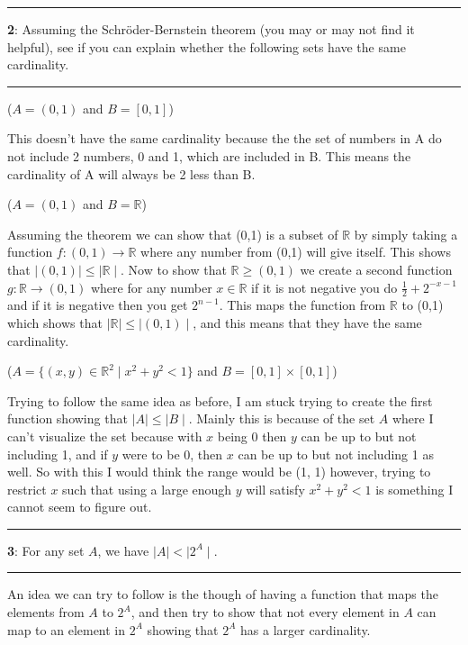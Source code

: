 \documentclass[11pt]{article}
\newcommand\question[2]{\vspace{.25in}\hrule\textbf{#1}: #2\vspace{.5em}\hrule\vspace{.10in}}
\renewcommand\part[1]{\vspace{.10in}(#1)\par}
\newcommand{\R}{\mathbb{R}}
\begin{document}
\question{2}{Assuming the Schröder-Bernstein theorem (you may or may not find it helpful), see if you can explain whether the following sets have the same cardinality.}

\part{$A = ( 0 , 1 )$ and $B=[0,1]$}

This doesn't have the same cardinality because the the set of numbers in A do not include 2 numbers, 0 and 1, which are included in B. This means the cardinality of A will always be 2 less than B.

\part{$A = ( 0 , 1 )$ and $ B=\mathbb{R}$}
Assuming the theorem we can show that (0,1) is a subset of $\R$ by simply taking a function $f: (0,1) \rightarrow \R$ where any number from (0,1) will give itself. This shows that $\mid (0,1) \mid \le \mid \R \mid$. Now to show that $\R \ge (0,1)$ we create a second function $g: \R \rightarrow (0,1)$ where for any number $x \in \R$ if it is not negative you do $\frac{1}{2} + 2^{-x-1}$ and if it is negative then you get $2^{n-1}$. This maps the function from $\R$ to (0,1) which shows that $\mid \R \mid \le \mid (0,1) \mid$, and this means that they have the same cardinality.


\part{$A=\{(x,y)\in\mathbb{R}^2\mid x^2+y^2<1\}$ and $B=[0,1]\times[0,1]$}
Trying to follow the same idea as before, I am stuck trying to create the first function showing that $\mid A \mid \le \mid B \mid$. Mainly this is because of the set $A$ where I can't visualize the set because with $x$ being 0 then $y$ can be up to but not including 1, and if $y$ were to be 0, then $x$ can be up to but not including 1 as well. So with this I would think the range would be (1, 1) however, trying to restrict $x$ such that using a large enough $y$ will satisfy $x^2+y^2 < 1$ is something I cannot seem to figure out.

\question{3}{For any set $A$, we have $\mid A \mid < \mid 2^A \mid$.}

An idea we can try to follow is the though of having a function that maps the elements from $A$ to $2^A$, and then try to show that not every element in $A$ can map to an element in $2^A$ showing that $2^A$ has a larger cardinality. 
	
\end{document}
